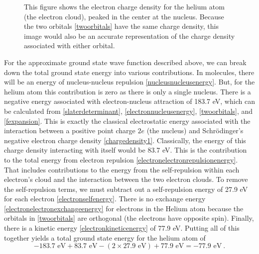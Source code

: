 \documentclass[12pt,onecolumn,secnumarabic,amsmath,amssymb,balancelastpage,nofootinbib]{article}
\begin{document}
\begin{figure}[htb]
\caption{This figure shows the electron charge density for the helium atom (the electron cloud), peaked in the center at the nucleus.  Because the two orbitals \eqref{twoorbitals} have the same charge density, this image would also be an accurate representation of the charge density associated with either orbital.}
\label{helium}
\end{figure}

For the approximate ground state wave function described above, we can break down the total ground state energy into various contributions.  In molecules, there will be an energy of nucleus-nucleus repulsion \eqref{nucleusnucleusenergy}.  But, for the helium atom this contribution is zero as there is only a single nucleus.  There is a negative energy associated with electron-nucleus attraction of 183.7 eV, which can be calculated from \eqref{slaterdeterminant}, \eqref{electronnucleusenergy}, \eqref{twoorbitals}, and \eqref{fexpansion}.  This is exactly the classical electrostatic energy associated with the interaction between a positive point charge $2e$ (the nucleus) and Schr\"{o}dinger's negative electron charge density \eqref{chargedensity1}.  Classically, the energy of this charge density interacting with itself would be 83.7 eV.  This is the contribution to the total energy from electron repulsion \eqref{electronelectronrepulsionenergy}.  That includes contributions to the energy from the self-repulsion within each electron's cloud and the interaction between the two electron clouds.  To remove the self-repulsion terms, we must subtract out a self-repulsion energy of 27.9 eV for each electron \eqref{electronselfenergy}.  There is no exchange energy \eqref{electronelectronexchangeenergy} for electrons in the Helium atom because the orbitals in \eqref{twoorbitals} are orthogonal (the electrons have opposite spin).  Finally, there is a kinetic energy \eqref{electronkineticenergy} of 77.9 eV.  Putting all of this together yields a total ground state energy for the helium atom of
\begin{equation}
-183.7\mbox{ eV}+83.7\mbox{ eV}-(2 \times 27.9\mbox{ eV})+77.9\mbox{ eV}=-77.9\mbox{ eV}
\ .
\end{equation}
\end{document}
